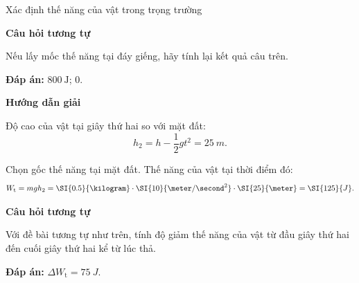 \begin{dang}{Xác định thế năng của vật trong trọng trường}
{		
		\begin{center}
			\textbf{Câu hỏi tương tự}
		\end{center}
		
		Nếu lấy mốc thế năng tại đáy giếng, hãy tính lại kết quả câu trên.
		
		\textbf{Đáp án:} $\SI{800}{\joule}$; $0$.
	}
	{	\begin{center}
			\textbf{Hướng dẫn giải}
		\end{center}
		
		Độ cao của vật tại giây thứ hai so với mặt đất:
		$$h_2 = h - \dfrac{1}{2}gt^2 = \SI{25}{m}.$$
		
		Chọn gốc thế năng tại mặt đất. Thế năng của vật tại thời điểm đó:
		$$W_\text t = mgh_2 = \SI{0.5}{\kilogram}\cdot\SI{10}{\meter/\second^2}\cdot\SI{25}{\meter}=\SI{125}{J}.$$
		
		\begin{center}
			\textbf{Câu hỏi tương tự}
		\end{center}
		
		Với đề bài tương tự như trên, tính độ giảm thế năng của vật từ đầu giây thứ hai đến cuối giây thứ hai kể từ lúc thả.
		
		\textbf{Đáp án:} $\Delta W_\text{t} = \SI{75}{J}$.
	}
\end{dang}

